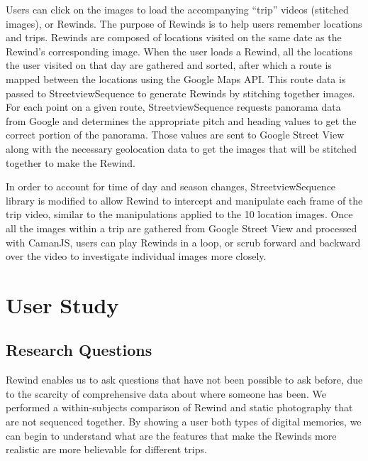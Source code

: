\documentclass{sigchi}
\begin{document}

Users can click on the images to load the accompanying ``trip'' videos (stitched images), or Rewinds. The purpose of Rewinds is to help users remember locations and trips. Rewinds are composed of locations visited on the same date as the Rewind's corresponding image. When the user loads a Rewind, all the locations the user visited on that day are gathered and sorted, after which a route is mapped between the locations using the Google Maps API. This route data is passed to StreetviewSequence to generate Rewinds by stitching together images. For each point on a given route, StreetviewSequence requests panorama data from Google and determines the appropriate pitch and heading values to get the correct portion of the panorama. Those values are sent to Google Street View along with the necessary geolocation data to get the images that will be stitched together to make the Rewind.

In order to account for time of day and season changes, StreetviewSequence library is modified to allow Rewind to intercept and manipulate each frame of the trip video, similar to the manipulations applied to the 10 location images. Once all the images within a trip are gathered from Google Street View and processed with CamanJS, users can play Rewinds in a loop, or scrub forward and backward over the video to investigate individual images more closely.

\section{User Study}
\subsection{Research Questions}
Rewind enables us to ask questions that have not been possible to ask before, due to the scarcity of comprehensive data about where someone has been. We performed a within-subjects comparison of Rewind and static photography that are not sequenced together. By showing a user both types of digital memories, we can begin to understand what are the features that make the Rewinds more realistic are more believable for different trips.
\end{document}
